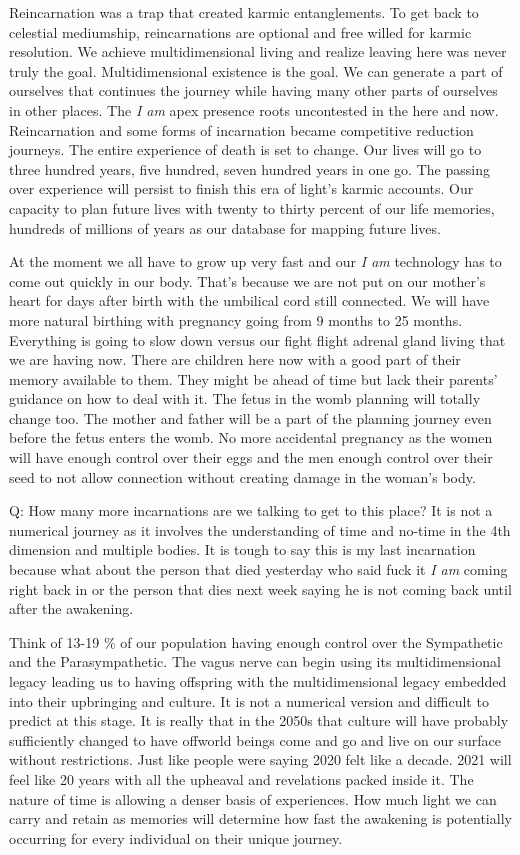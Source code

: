 Reincarnation was a trap that created karmic entanglements. To get back
to celestial mediumship, reincarnations are optional and free willed for
karmic resolution. We achieve multidimensional living and realize
leaving here was never truly the goal. Multidimensional existence is the
goal. We can generate a part of ourselves that continues the journey
while having many other parts of ourselves in other places. The \emph{I
am} apex presence roots uncontested in the here and now. Reincarnation
and some forms of incarnation became competitive reduction journeys. The
entire experience of death is set to change. Our lives will go to three
hundred years, five hundred, seven hundred years in one go. The passing
over experience will persist to finish this era of light's karmic
accounts. Our capacity to plan future lives with twenty to thirty
percent of our life memories, hundreds of millions of years as our
database for mapping future lives.

At the moment we all have to grow up very fast and our \emph{I am}
technology has to come out quickly in our body. That's because we are
not put on our mother's heart for days after birth with the umbilical
cord still connected. We will have more natural birthing with pregnancy
going from 9 months to 25 months. Everything is going to slow down
versus our fight flight adrenal gland living that we are having now.
There are children here now with a good part of their memory available
to them. They might be ahead of time but lack their parents' guidance on
how to deal with it. The fetus in the womb planning will totally change
too. The mother and father will be a part of the planning journey even
before the fetus enters the womb. No more accidental pregnancy as the
women will have enough control over their eggs and the men enough
control over their seed to not allow connection without creating damage
in the woman's body.

Q: How many more incarnations are we talking to get to this place? It is
not a numerical journey as it involves the understanding of time and
no-time in the 4th dimension and multiple bodies. It is tough to say
this is my last incarnation because what about the person that died
yesterday who said fuck it \emph{I am} coming right back in or the
person that dies next week saying he is not coming back until after the
awakening.

Think of 13-19 \% of our population having enough control over the
Sympathetic and the Parasympathetic. The vagus nerve can begin using its
multidimensional legacy leading us to having offspring with the
multidimensional legacy embedded into their upbringing and culture. It
is not a numerical version and difficult to predict at this stage. It is
really that in the 2050s that culture will have probably sufficiently
changed to have offworld beings come and go and live on our surface
without restrictions. Just like people were saying 2020 felt like a
decade. 2021 will feel like 20 years with all the upheaval and
revelations packed inside it. The nature of time is allowing a denser
basis of experiences. How much light we can carry and retain as memories
will determine how fast the awakening is potentially occurring for every
individual on their unique journey.

